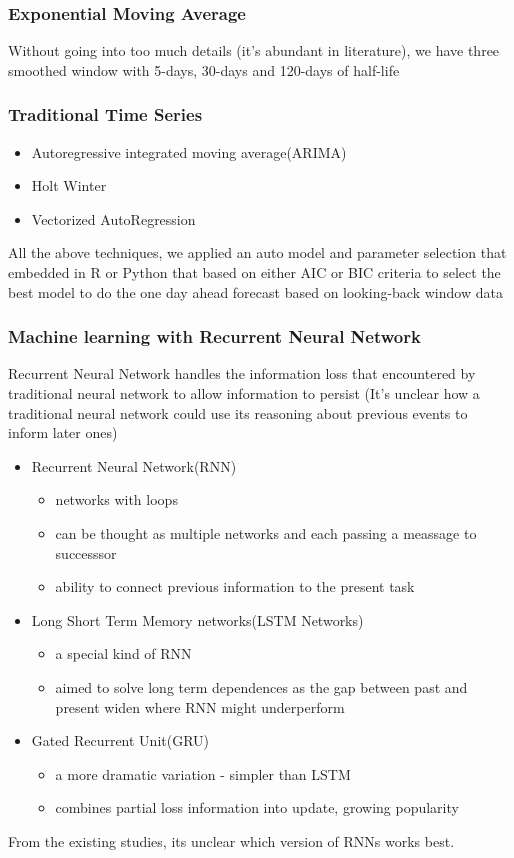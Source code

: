 \documentclass[12pt]{article}
\numberwithin{equation}{section}
\begin{document}
\subsubsection{Exponential Moving Average}
Without going into too much details (it's abundant in literature), we have three smoothed window with 5-days, 30-days and 120-days of half-life
\subsubsection{Traditional Time Series}
\begin{itemize}
  \setlength{\itemindent}{.25in}
  \item  Autoregressive integrated moving average(ARIMA) 
  \item  Holt Winter
  \item  Vectorized AutoRegression
\end{itemize}
All the above techniques, we applied an auto model and parameter selection that embedded in R or Python that based on either AIC or BIC criteria to select the best model to do the one day ahead forecast based on looking-back window data

\subsubsection{Machine learning with Recurrent Neural Network}
Recurrent Neural Network handles the information loss that encountered by traditional neural network to allow information to persist (It's unclear how a traditional neural network could use its reasoning about previous events to inform later ones)
\begin{itemize}
  \item  Recurrent Neural Network(RNN)
    \begin{itemize}
      \item networks with loops
      \item can be thought as multiple networks and each passing a meassage to successsor
      \item ability to connect previous information to the present task
    \end{itemize}
  \item  Long Short Term Memory networks(LSTM Networks)
    \begin{itemize}
      \item a special kind of RNN 
      \item aimed to solve long term dependences as the gap between past and present widen where RNN might underperform
    \end{itemize}
  \item  Gated Recurrent Unit(GRU)
    \begin{itemize}
      \item a more dramatic variation - simpler than LSTM
      \item combines partial loss information into update, growing popularity
    \end{itemize}
\end{itemize}
From the existing studies, its unclear which version of RNNs works best.
\end{document}
